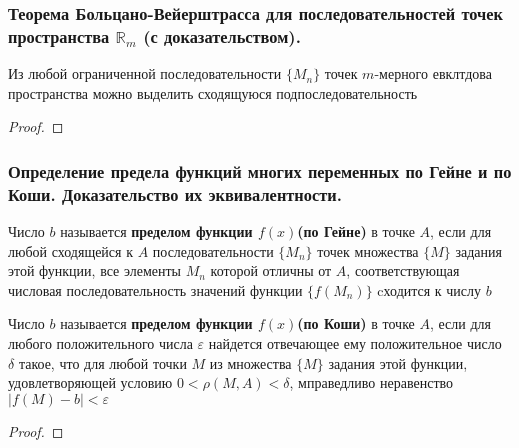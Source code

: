 \documentclass[10pt]{article}
\begin{document}
    \subsubsection{Теорема Больцано-Вейерштрасса для последовательностей точек пространства \texorpdfstring{$\mathbb{R}_m$}{Rm} (с доказательством).}
    \begin{theorem}
        Из любой ограниченной последовательности $\{M_n\}$ точек $m$-мерного евклтдова пространства можно выделить сходящуюся подпоследовательность 
    \end{theorem}
    \begin{proof}
    \end{proof}



    \subsubsection{Определение предела функций многих переменных по Гейне и по Коши. Доказательство их эквивалентности.}
    \begin{definition}
        Число $b$ называется \textbf{пределом функции $f(x)$(по Гейне)} в точке $A$, если для любой сходящейся к $A$ последовательности $\{M_n\}$ точек множества $\{M\}$ задания этой функции, все элементы $M_n$ которой отличны от $A$, соответствующая числовая последовательность значений функции $\{f(M_n)\}$ cходится к числу $b$
    \end{definition}
    \begin{definition}
        Число $b$ называется \textbf{пределом функции $f(x)$(по Коши)} в точке $A$, если для любого положительного числа $\varepsilon$ найдется отвечающее ему положительное число $\delta$ такое, что для любой точки $M$ из множества $\{M\}$ задания этой функции, удовлетворяющей условию $0 < \rho(M, A) < \delta$, мправедливо неравенство $|f(M) - b| < \varepsilon$
    \end{definition}
    \begin{proof}
    \end{proof}
\end{document}
